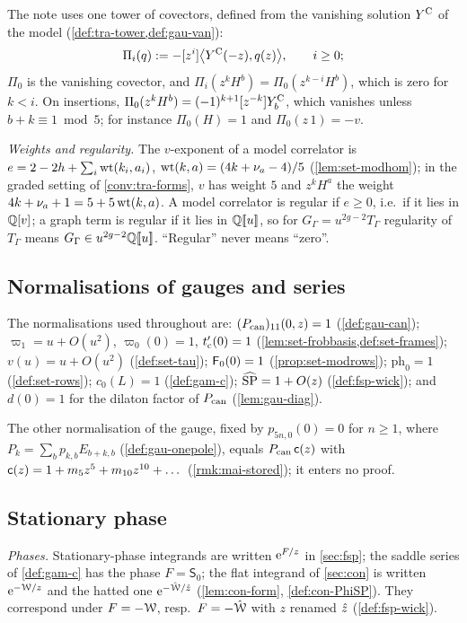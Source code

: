 The note uses one tower of covectors, defined from the vanishing solution $Y^{\mathrm{C}}$ of the model (\cref{def:tra-tower,def:gau-van}):
\[
\Pi_i(q):=-[z^i]\bigl\langle Y^{\mathrm{C}}(-z),q(z)\bigr\rangle,\qquad i\geq0;
\]
$\Pi_0$ is the vanishing covector, and $\Pi_i(z^kH^b)=\Pi_0(z^{k-i}H^b)$, which is zero for $k<i$. On insertions, $\Pi_0(z^kH^b)=(-1)^{k+1}[z^{-k}]Y^{\mathrm{C}}_b$, which vanishes unless $b+k\equiv1\bmod5$; for instance $\Pi_0(H)=1$ and $\Pi_0(z\,1)=-v$.

\emph{Weights and regularity.} The $v$-exponent of a model correlator is $e=2-2h+\sum_i\operatorname{wt}(k_i,a_i)$, $\operatorname{wt}(k,a)=(4k+\nu_a-4)/5$ (\cref{lem:set-modhom}); in the graded setting of \cref{conv:tra-forms}, $v$ has weight $5$ and $z^kH^a$ the weight $4k+\nu_a+1=5+5\operatorname{wt}(k,a)$. A model correlator is regular if $e\geq0$, i.e.\ if it lies in $\mathbb{Q}[v]$; a graph term is regular if it lies in $\mathbb{Q}[\![ u ]\!]$, so for $G_\Gamma=u^{2g-2}T_\Gamma$ regularity of $T_\Gamma$ means $G_\Gamma\in u^{2g-2}\mathbb{Q}[\![ u ]\!]$. ``Regular'' never means ``zero''.

\subsection{Normalisations of gauges and series}
\label{sec:sgn-norm}

The normalisations used throughout are: $(P_{\mathrm{can}})_{11}(0,z)=1$ (\cref{def:gau-can}); $\varpi_1=u+O(u^2)$, $\varpi_0(0)=1$, $t_{\mathrm{c}}'(0)=1$ (\cref{lem:set-frobbasis,def:set-frames}); $v(u)=u+O(u^2)$ (\cref{def:set-tau}); $\mathsf{F}_0(0)=1$ (\cref{prop:set-modrows}); $\mathrm{ph}_0=1$ (\cref{def:set-rows}); $c_0(L)=1$ (\cref{def:gam-c}); $\widehat{\mathrm{SP}}=1+O(z)$ (\cref{def:fsp-wick}); and $d(0)=1$ for the dilaton factor of $P_{\mathrm{can}}$ (\cref{lem:gau-diag}).

The other normalisation of the gauge, fixed by $p_{5n,0}(0)=0$ for $n\geq1$, where $P_k=\sum_bp_{k,b}E_{b+k,b}$ (\cref{def:gau-onepole}), equals $P_{\mathrm{can}}\,\mathsf{c}(z)$ with $\mathsf{c}(z)=1+m_5z^5+m_{10}z^{10}+\dots$ (\cref{rmk:mai-stored}); it enters no proof.

\subsection{Stationary phase}
\label{sec:sgn-sp}

\emph{Phases.} Stationary-phase integrands are written $\mathrm{e}^{F/z}$ in \cref{sec:fsp}; the saddle series of \cref{def:gam-c} has the phase $F=\mathsf S_0$; the flat integrand of \cref{sec:con} is written $\mathrm{e}^{-\mathcal{W}/z}$ and the hatted one $\mathrm{e}^{-\hat{\mathcal{W}}/\hat{z}}$ (\cref{lem:con-form}, \cref{def:con-PhiSP}). They correspond under $F=-\mathcal{W}$, resp.\ $F=-\hat{\mathcal{W}}$ with $z$ renamed $\hat{z}$ (\cref{def:fsp-wick}).

